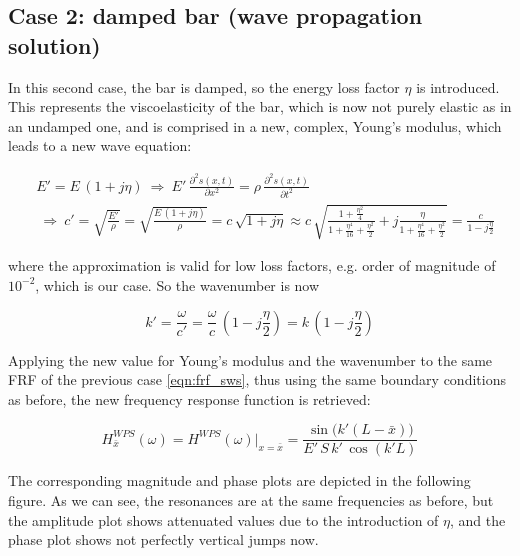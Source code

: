 \documentclass[a4paper,12pt,oneside]{article}
\begin{document}
\clearpage

\begin{figure}[h]
	\vspace{50pt}
	\centering
	\def\svgwidth{\columnwidth}
	
\end{figure}

\subsection*{Case 2: damped bar (wave propagation solution)}

In this second case, the bar is damped, so the energy loss factor $ \eta $ is introduced. This represents the viscoelasticity of the bar, which is now not purely elastic as in an undamped one, and is comprised in a new, complex, Young's modulus, which leads to a new wave equation:

\[ \begin{split}
	& E' = E \, (1 + j \eta) ~ \Rightarrow ~
		E' \,	\frac{\partial^2 s(x,t)}{\partial x^2} =
		\rho \, \frac{\partial^2 s(x,t)}{\partial t^2} \\
	& ~ \Rightarrow ~ c' = \sqrt{\frac{E'}{\rho}} = \sqrt{\frac{E \,(1 + j \eta)}{\rho}}
		= c \, \sqrt{1 + j \eta} \approx
		c \, \sqrt{\frac{1 + \frac{\eta^2}{4}}{1 + \frac{\eta^4}{16} + \frac{\eta^2}{2}} +
		j \frac{\eta}{1 + \frac{\eta^4}{16} + \frac{\eta^2}{2}}}
		= \frac{c}{1 - j \frac{\eta}{2}}
\end{split} \]

where the approximation is valid for low loss factors, e.g. order of magnitude of $ 10^{-2} $, which is our case. So the wavenumber is now

\[
	k' = \frac{\omega}{c'} = \frac{\omega}{c} \, (1 - j \frac{\eta}{2})
		= k \, (1 - j \frac{\eta}{2})
\]

Applying the new value for Young's modulus and the wavenumber to the same FRF of the previous case \eqref{eqn:frf_sws}, thus using the same boundary conditions as before, the new frequency response function is retrieved:

\[
	H^{WPS}_{\bar{x}}(\omega) = H^{WPS}(\omega)\big|_{x = \bar{x}} = %
		\frac{\sin\bigl(k'(L - \bar{x})\bigr)}{E' \, S \, k' \, \cos(k'L)}
\]

\vspace{10pt}

The corresponding magnitude and phase plots are depicted in the following figure. As we can see, the resonances are at the same frequencies as before, but the amplitude plot shows attenuated values due to the introduction of $ \eta $, and the phase plot shows not perfectly vertical jumps now.
\end{document}
